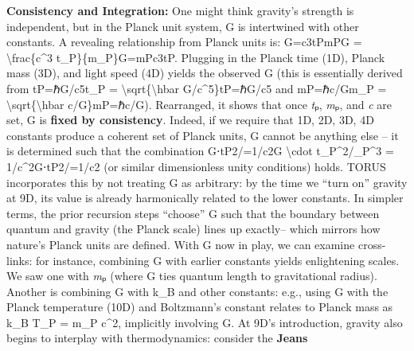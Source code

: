 \documentclass[
]{article}
\begin{document}
{\textbf{Consistency and Integration:} One might think gravity's strength
is independent, but in the Planck unit system, G is intertwined with
other constants. A revealing relationship from Planck units is:
G=c3tPmPG = \textbackslash frac\{c\^{}3
t\_P\}\{m\_P\}G=mP\hspace{0pt}c3tP\hspace{0pt}\hspace{0pt}\hspace{0pt}.
Plugging in the Planck time (1D), Planck mass (3D), and light speed (4D)
yields the observed G (this is essentially derived from tP=ℏG/c5t\_P =
\textbackslash sqrt\{\textbackslash hbar
G/c\^{}5\}tP\hspace{0pt}=ℏG/c5\hspace{0pt} and mP=ℏc/Gm\_P =
\textbackslash sqrt\{\textbackslash hbar
c/G\}mP\hspace{0pt}=ℏc/G\hspace{0pt}). Rearranged, it shows that once
\emph{t}ₚ, \emph{m}ₚ, and \emph{c} are set, G is \textbf{fixed by
consistency}\hspace{0pt}. Indeed, if we require that 1D, 2D, 3D, 4D
constants produce a coherent set of Planck units, G cannot be anything
else -- it is determined such that the combination G⋅tP2/=1/c2G
\textbackslash cdot t\_P\^{}2/\ell\_P\^{}3 =
1/c\^{}2G⋅tP2\hspace{0pt}/\hspace{0pt}=1/c2 (or similar dimensionless
unity conditions) holds\hspace{0pt}. TORUS incorporates this by not
treating G as arbitrary: by the time we ``turn on'' gravity at 9D, its
value is already harmonically related to the lower
constants\hspace{0pt}. In simpler terms, the prior recursion steps
``choose'' G such that the boundary between quantum and gravity (the
Planck scale) lines up exactly\hspace{0pt}-- which mirrors how nature's
Planck units are defined. With G now in play, we can examine
cross-links: for instance, combining G with earlier constants yields
enlightening scales. We saw one with \emph{m}ₚ (where G ties quantum
length to gravitational radius). Another is combining G with k\_B and
other constants: e.g., using G with the Planck temperature (10D) and
Boltzmann's constant relates to Planck mass as k\_B T\_P = m\_P c\^{}2,
implicitly involving G\hspace{0pt}. At 9D's introduction, gravity also
begins to interplay with thermodynamics: consider the \textbf{Jeans
}}
\end{document}
